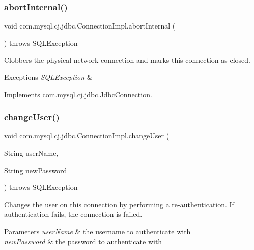 \subsubsection{\texorpdfstring{abort\+Internal()}{abortInternal()}}
{\footnotesize\ttfamily void com.\+mysql.\+cj.\+jdbc.\+Connection\+Impl.\+abort\+Internal (\begin{DoxyParamCaption}{ }\end{DoxyParamCaption}) throws S\+Q\+L\+Exception}

Clobbers the physical network connection and marks this connection as closed.


\begin{DoxyExceptions}{Exceptions}
{\em S\+Q\+L\+Exception} & \\
\hline
\end{DoxyExceptions}


Implements \mbox{\hyperlink{interfacecom_1_1mysql_1_1cj_1_1jdbc_1_1_jdbc_connection}{com.\+mysql.\+cj.\+jdbc.\+Jdbc\+Connection}}.

\mbox{\label{classcom_1_1mysql_1_1cj_1_1jdbc_1_1_connection_impl_a124604d3aae705d3e14bc1deb6a3f9a9}} 
\subsubsection{\texorpdfstring{change\+User()}{changeUser()}}
{\footnotesize\ttfamily void com.\+mysql.\+cj.\+jdbc.\+Connection\+Impl.\+change\+User (\begin{DoxyParamCaption}\item[{String}]{user\+Name,  }\item[{String}]{new\+Password }\end{DoxyParamCaption}) throws S\+Q\+L\+Exception}

Changes the user on this connection by performing a re-\/authentication. If authentication fails, the connection is failed.


\begin{DoxyParams}{Parameters}
{\em user\+Name} & the username to authenticate with \\
\hline
{\em new\+Password} & the password to authenticate with \\
\hline
\end{DoxyParams}

